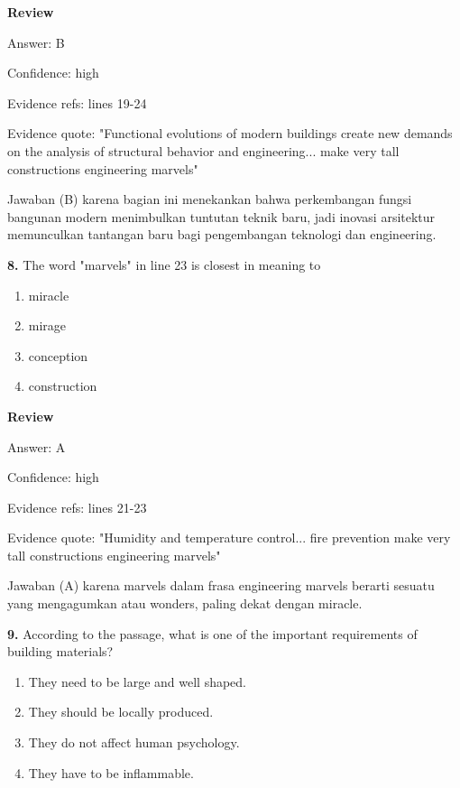\documentclass[12pt]{article}
\begin{document}
\par
\begingroup
\setlength{\parskip}{0pt}
\setlength{\parindent}{0pt}
\textbf{Review}\par
Answer: B\par
Confidence: high\par
Evidence refs: lines 19-24\par
Evidence quote: "Functional evolutions of modern buildings create new demands on the analysis of structural behavior and engineering... make very tall constructions engineering marvels"\par
Jawaban (B) karena bagian ini menekankan bahwa perkembangan fungsi bangunan modern menimbulkan tuntutan teknik baru, jadi inovasi arsitektur memunculkan tantangan baru bagi pengembangan teknologi dan engineering.\par
\endgroup
\par
\vspace{0.25\baselineskip}
\noindent\textbf{8.} The word "marvels" in line 23 is closest in meaning to
\begin{enumerate}[label=(\Alph*),leftmargin=*,itemsep=0.2em]
\item miracle
\item mirage
\item conception
\item construction
\end{enumerate}
\par
\begingroup
\setlength{\parskip}{0pt}
\setlength{\parindent}{0pt}
\textbf{Review}\par
Answer: A\par
Confidence: high\par
Evidence refs: lines 21-23\par
Evidence quote: "Humidity and temperature control... fire prevention make very tall constructions engineering marvels"\par
Jawaban (A) karena marvels dalam frasa engineering marvels berarti sesuatu yang mengagumkan atau wonders, paling dekat dengan miracle.\par
\endgroup
\par
\vspace{0.25\baselineskip}
\noindent\textbf{9.} According to the passage, what is one of the important requirements of building materials?
\begin{enumerate}[label=(\Alph*),leftmargin=*,itemsep=0.2em]
\item They need to be large and well shaped.
\item They should be locally produced.
\item They do not affect human psychology.
\item They have to be inflammable.
\end{enumerate}
\end{document}
